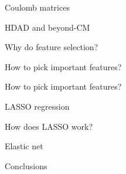 \begin{frame}[t]{Coulomb matrices}

\end{frame}
\begin{frame}[t]{HDAD and beyond-CM}

\end{frame}
%
%
\begin{frame}[t]{Why do feature selection?}

\end{frame}
\begin{frame}[t]{How to pick important features?}

\end{frame}
\begin{frame}[t]{How to pick important features?}

\end{frame}
\begin{frame}[t]{LASSO regression}

\end{frame}
\begin{frame}[t]{How does LASSO work?}

\end{frame}
\begin{frame}[t]{Elastic net}

\end{frame}
\begin{frame}[t]{Conclusions}

\end{frame}
